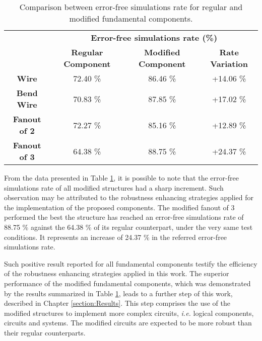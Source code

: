 \begin{table}[H]
\centering
\caption{Comparison between error-free simulations rate for regular and modified fundamental components.}
\label{table:fundamental_components_comparison}
\begin{tabular}{|c|c|c|c|}
\hline
\multirow{2}{*}{}    & \multicolumn{3}{c|}{\textbf{Error-free simulations rate (\%)}}                     \\ \cline{2-4} 
                     & \textbf{Regular Component} & \textbf{Modified Component} & \textbf{Rate Variation} \\ \hline
\textbf{Wire}        & 72.40 \%                    & 86.46 \%                     & +14.06 \%                 \\ \hline
\textbf{Bend Wire}   & 70.83 \%                    & 87.85 \%                     & +17.02 \%                \\ \hline
\textbf{Fanout of 2} & 72.27 \%                    & 85.16 \%                     & +12.89 \%                 \\ \hline
\textbf{Fanout of 3} & 64.38 \%                    & 88.75 \%                     & +24.37 \%                \\ \hline
\end{tabular}
\end{table}

From the data presented in Table \ref{table:fundamental_components_comparison}, it is possible to note that the error-free simulations rate of all modified structures had a sharp increment. Such observation may be attributed to the robustness enhancing strategies applied for the implementation of the proposed components. The modified fanout of 3 performed the best \textemdash the structure has reached an error-free simulations rate of 88.75 \% against the 64.38 \% of its regular counterpart, under the very same test conditions. It represents an increase of 24.37 \% in the referred error-free simulations rate.

Such positive result reported for all fundamental components testify the efficiency of the robustness enhancing strategies applied in this work. The superior performance of the modified fundamental components, which was demonstrated by the results summarized in Table \ref{table:fundamental_components_comparison}, leads to a further step of this work, described in Chapter \ref{section:Results}. This step comprises the use of the modified structures to implement more complex circuits, \textit{i.e.} logical components, circuits and systems. The modified circuits are expected to be more robust than their regular counterparts.

